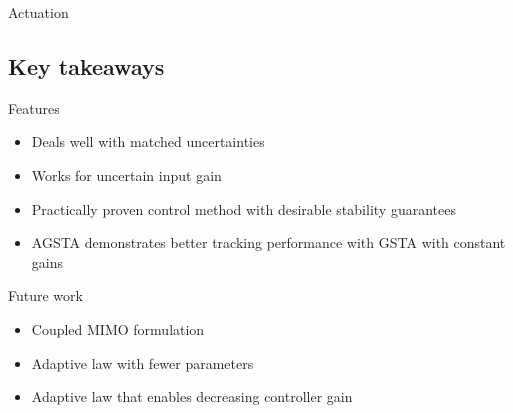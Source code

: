 Actuation \cite{Bor:22}



\subsection{Key takeaways}
Features
\begin{itemize}
    \item Deals well with matched uncertainties
    \item Works for uncertain input gain
    \item Practically proven control method with desirable stability guarantees
    \item AGSTA demonstrates better tracking performance with GSTA with constant gains
\end{itemize}
Future work
\begin{itemize}
    \item Coupled MIMO formulation
    \item Adaptive law with fewer parameters
    \item Adaptive law that enables decreasing controller gain
\end{itemize}
